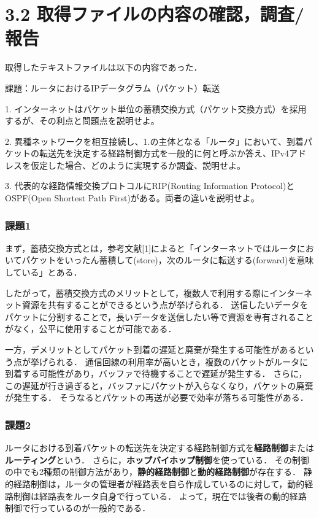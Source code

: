 \documentclass[documentclass]{jsarticle}
\begin{document}
\section*{3.2 取得ファイルの内容の確認，調査/報告}
取得したテキストファイルは以下の内容であった．
\begin{tcolorbox}
  課題：ルータにおけるIPデータグラム（パケット）転送

  1. インターネットはパケット単位の蓄積交換方式（パケット交換方式）を採用するが、その利点と問題点を説明せよ。
  
  2. 異種ネットワークを相互接続し、1.の主体となる「ルータ」において、到着パケットの転送先を決定する経路制御方式を一般的に何と呼ぶか答え、IPv4アドレスを仮定した場合、どのように実現するか調査、説明せよ。
  
  3. 代表的な経路情報交換プロトコルにRIP(Routing Information Protocol)とOSPF(Open Shortest Path First)がある。両者の違いを説明せよ。
\end{tcolorbox}

\subsubsection*{課題1}
まず，蓄積交換方式とは，参考文献[1]によると「インターネットではルータにおいてパケットをいったん蓄積して(store)，次のルータに転送する(forward)を意味している」とある．

したがって，蓄積交換方式のメリットとして，複数人で利用する際にインターネット資源を共有することができるという点が挙げられる．
送信したいデータをパケットに分割することで，長いデータを送信したい等で資源を専有されることがなく，公平に使用することが可能である．

一方，デメリットとしてパケット到着の遅延と廃棄が発生する可能性があるという点が挙げられる．
通信回線の利用率が高いとき，複数のパケットがルータに到着する可能性があり，バッファで待機することで遅延が発生する．
さらに，この遅延が行き過ぎると，バッファにパケットが入らなくなり，パケットの廃棄が発生する．
そうなるとパケットの再送が必要で効率が落ちる可能性がある．

\subsubsection*{課題2}
ルータにおける到着パケットの転送先を決定する経路制御方式を\textbf{経路制御}または\textbf{ルーティング}という．
さらに，\textbf{ホップバイホップ制御}を使っている．
その制御の中でも2種類の制御方法があり，\textbf{静的経路制御}と\textbf{動的経路制御}が存在する．
静的経路制御は，ルータの管理者が経路表を自ら作成しているのに対して，動的経路制御は経路表をルータ自身で行っている．
よって，現在では後者の動的経路制御で行っているのが一般的である．
\end{document}
